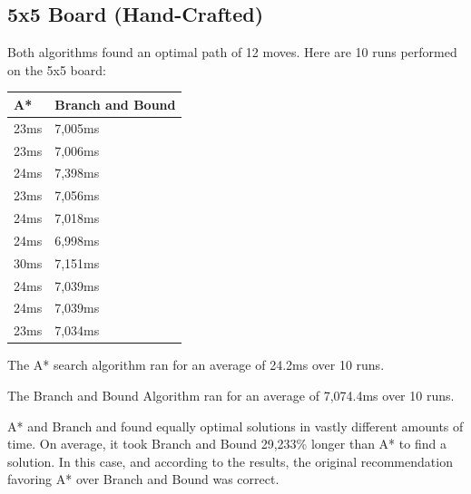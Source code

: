 \documentclass[12pt, letterpaper, final, onecolumn, titlepage] {article}
\begin{document}
\subsection{5x5 Board (Hand-Crafted)}
Both algorithms found an optimal path of 12 moves.  Here are 10 runs performed on the 5x5 board:
\begin{center}
\begin{tabular}{|p{4cm}|p{4cm}|}
\hline
\textbf{A*} & \textbf{Branch and Bound} \\
\hline
23ms & 7,005ms \\
\hline
23ms & 7,006ms \\
\hline
24ms & 7,398ms \\
\hline
23ms & 7,056ms \\
\hline
24ms & 7,018ms \\
\hline
24ms & 6,998ms \\
\hline
30ms & 7,151ms \\
\hline
24ms & 7,039ms \\
\hline
24ms & 7,039ms \\
\hline
23ms & 7,034ms \\
\hline
\end{tabular}
\end{center}
\noindent The A* search algorithm ran for an average of 24.2ms over 10 runs.

\noindent The Branch and Bound Algorithm ran for an average of 7,074.4ms over 10 runs.

\noindent A* and Branch and found equally optimal solutions in vastly different amounts of time.  On average, it took Branch and Bound 29,233\% longer than A* to find a solution. In this case, and according to the results, the original recommendation favoring A* over Branch and Bound was correct.

\newpage
\end{document}

